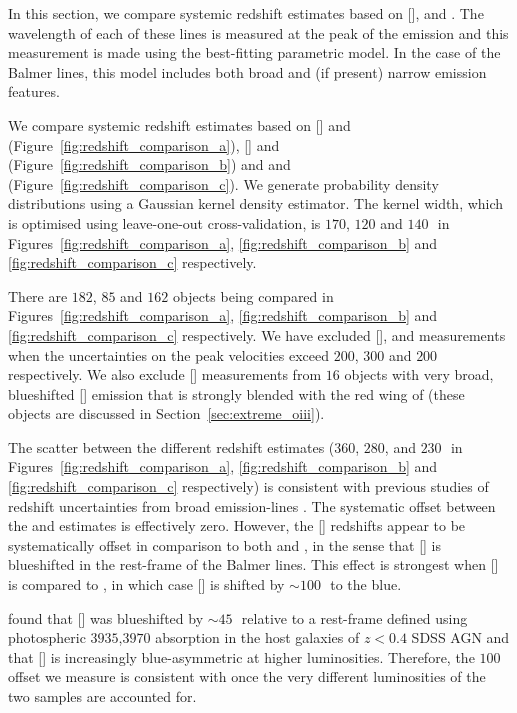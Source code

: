 In this section, we compare systemic redshift estimates based on [], \hb and \hans.
The wavelength of each of these lines is measured at the peak of the emission and this measurement is made using the best-fitting parametric model.
In the case of the Balmer lines, this model includes both broad and (if present) narrow emission features.

We compare systemic redshift estimates based on [] and \hb (Figure~\ref{fig:redshift_comparison_a}), [] and \ha (Figure~\ref{fig:redshift_comparison_b}) and \hb and \ha (Figure~\ref{fig:redshift_comparison_c}).
We generate probability density distributions using a Gaussian kernel density estimator.
The kernel width, which is optimised using leave-one-out cross-validation, is $170$, $120$ and $140$\,\kms\, in Figures~\ref{fig:redshift_comparison_a}, \ref{fig:redshift_comparison_b} and \ref{fig:redshift_comparison_c} respectively.

There are $182$, $85$ and $162$ objects being compared in Figures~\ref{fig:redshift_comparison_a}, \ref{fig:redshift_comparison_b} and \ref{fig:redshift_comparison_c} respectively.
We have excluded [], \hb and \ha measurements when the uncertainties on the peak velocities exceed $200$, $300$ and $200$\,\kms\, respectively.
We also exclude [] measurements from $16$ objects with very broad, blueshifted [] emission that is strongly blended with the red wing of \hb (these objects are discussed in Section~\ref{sec:extreme_oiii}).

The scatter between the different redshift estimates ($360$, $280$, and $230$\,\kms\, in Figures~\ref{fig:redshift_comparison_a}, \ref{fig:redshift_comparison_b} and \ref{fig:redshift_comparison_c} respectively) is consistent with previous studies of redshift uncertainties from broad emission-lines \citep[e.g.][]{shen16b}.
The systematic offset between the \ha and \hb estimates is effectively zero.
However, the [] redshifts appear to be systematically offset in comparison to both \ha and \hbns, in the sense that [] is blueshifted in the rest-frame of the Balmer lines.
This effect is strongest when [] is compared to \hbns, in which case [] is shifted by $\sim100$\,\kms\, to the blue.

\citet{hewett10} found that [] was blueshifted by $\sim45$\,\kms\, relative to a rest-frame defined using photospheric \ll$3935$,$3970$ absorption in the host galaxies of $z<0.4$ SDSS AGN and that [] is increasingly blue-asymmetric at higher luminosities.
Therefore, the $100$\,\kms offset we measure is consistent with \citet{hewett10} once the very different luminosities of the two samples are accounted for.

